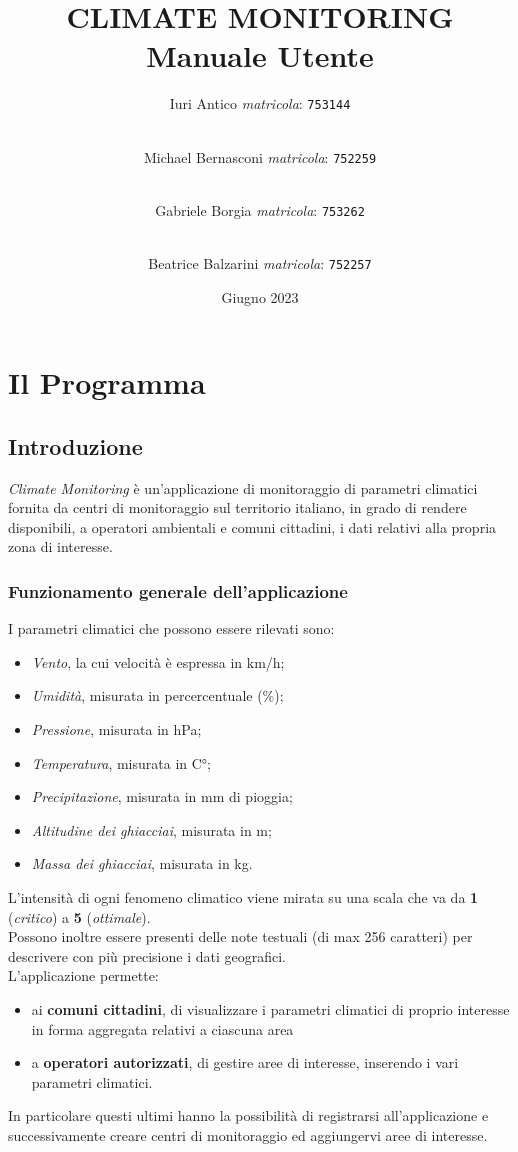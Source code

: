 \documentclass[a4paper, 12pt]{report}
\title {
	CLIMATE MONITORING \\
	Manuale Utente}
\author{
	Iuri Antico \textit{matricola}:
	\texttt{753144}
	\and \\
	Michael Bernasconi \textit{matricola}:
	\texttt{752259}
	\and \\
	Gabriele Borgia \textit{matricola}:
	\texttt{753262}
	\and \\
	Beatrice Balzarini \textit{matricola}:
	\texttt{752257}
}
\date{Giugno 2023}
\begin{document}
	\makeatletter
	\begin{titlepage}
		\maketitle
	\end{titlepage}
	\makeatother

	\tableofcontents
	\listoffigures
	\listoftables

	\chapter{Il Programma}
	\section{Introduzione}
		\textit{Climate Monitoring} è un'applicazione di monitoraggio di parametri climatici fornita da centri di monitoraggio sul territorio italiano, in grado di rendere disponibili, a operatori ambientali e comuni cittadini, i dati relativi alla propria zona di interesse.

		\subsection{Funzionamento generale dell'applicazione}
		I parametri climatici che possono essere rilevati sono:
		\begin{itemize}
		\item \textit{Vento}, la cui velocità è espressa in km/h;
		\item \textit{Umidità}, misurata in percercentuale (\%);
		\item \textit{Pressione}, misurata in hPa;
		\item \textit{Temperatura}, misurata in C°;
		\item \textit{Precipitazione}, misurata in mm di pioggia;
		\item \textit{Altitudine dei ghiacciai}, misurata in m;
		\item \textit{Massa dei ghiacciai}, misurata in kg.
		\end{itemize}
		L'intensità di ogni fenomeno climatico viene mirata su una scala che va da \textbf{1} (\textit{critico}) a \textbf{5} (\textit{ottimale}).
		\\
		Possono inoltre essere presenti delle note testuali (di max 256 caratteri) per descrivere con più precisione i dati geografici.
		\\
		L'applicazione permette:
		\begin{itemize}
		\item ai \textbf{comuni cittadini}, di visualizzare i parametri climatici di proprio interesse in forma aggregata relativi a ciascuna area
		\item a \textbf{operatori autorizzati}, di gestire aree di interesse, inserendo i vari parametri climatici.
		\end{itemize}
		In particolare questi ultimi hanno la possibilità di registrarsi all'applicazione e successivamente creare centri di monitoraggio ed aggiungervi aree di interesse.
\end{document}
